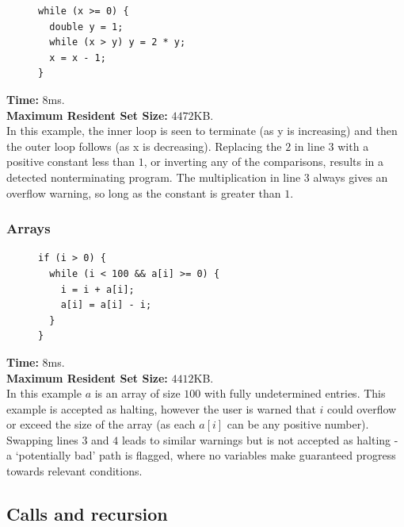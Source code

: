 \documentclass[12pt,a4paper]{article}
\begin{document}
\begin{figure}
\centering
\begin{lstlisting}[frame=tlrb,language=myLang]
while (x >= 0) {
  double y = 1;
  while (x > y) y = 2 * y;
  x = x - 1;
}
\end{lstlisting}
\end{figure}
\textbf{Time:} 8ms.\\ \textbf{Maximum Resident Set Size:} $4472$KB.\\
In this example, the inner loop is seen to terminate (as y is increasing) and then the outer loop follows (as x is decreasing). Replacing the $2$ in line $3$ with a positive constant less than $1$, or inverting any of the comparisons, results in a detected nonterminating program. The multiplication
in line $3$ always gives an overflow warning, so long as the constant is greater than $1$.

\subsubsection{Arrays \citep{svcomp}}
\begin{figure}
\centering
\begin{lstlisting}[frame=tlrb,language=myLang]
if (i > 0) {
  while (i < 100 && a[i] >= 0) {
    i = i + a[i];
    a[i] = a[i] - i;
  }
}
\end{lstlisting}
\end{figure}
\textbf{Time:} 8ms.\\ \textbf{Maximum Resident Set Size:} $4412$KB.\\
In this example $a$ is an array of size $100$ with fully undetermined  entries.
This example is accepted as halting, however the user is warned that $i$ could overflow or exceed the size of the array (as each $a[i]$ can be any positive number).
Swapping lines $3$ and $4$ leads to similar warnings but is not accepted as halting - a `potentially bad' path is flagged, where no variables make guaranteed progress towards 
relevant conditions.

\subsection{Calls and recursion}
\end{document}
